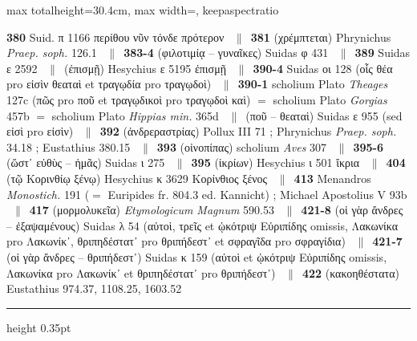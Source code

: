 \documentclass[11pt,twoside]{book}
\newcommand{\italique}[1]{\textit{#1}}
\newcommand{\Eustathe}{Eustathius }
\newcommand{\EtymMagnum}{\textit{Etymologicum Magnum} }
\newcommand{\Apostol}{Michael Apostolius }
\newcommand{\Phryn}{Phrynichus \textit{Praep. soph.} }
\newcommand{\espTest}{\ {\color{ruleGold}$\parallel$}\ }
\begin{document}
\begin{adjustbox}{max totalheight=30.4cm, max width=\textwidth, keepaspectratio}
\begin{minipage}{\textwidth}
{ \textbf{380} Suid. π 1166 περίθου νῦν τόνδε πρότερον \espTest \textbf{381} (χρέμπτεται) \Phryn 126.1 \espTest \textbf{383-4} (φιλοτιμίᾳ -- γυναῖκες) Suidas φ 431 \espTest \textbf{389} Suidas ε 2592 \espTest (ἐπισμῇ) Hesychius ε 5195 ἐπισμῇ \espTest \textbf{390-4} Suidas οι 128 (οἷς θέα pro εἰσὶν θεαταὶ et τραγῳδία pro τραγῳδοὶ) \espTest \textbf{390-1} scholium Plato \italique{Theages} 127c (πῶς pro ποῦ et τραγῳδικοὶ pro τραγῳδοὶ καὶ) $=$ scholium Plato \italique{Gorgias} 457b $=$ scholium Plato \italique{Hippias min.} 365d \espTest (ποῦ -- θεαταὶ) Suidas ε 955 (sed εἰσὶ pro εἰσὶν) \espTest \textbf{392} (ἀνδρεραστρίας) Pollux III 71 ; \Phryn 34.18 ; \Eustathe 380.15 \espTest \textbf{393} (οἰνοπίπας) scholium \italique{Aves} 307 \espTest \textbf{395-6} (ὥστ᾽ εὐθὺς -- ἡμᾶς) Suidas ι 275 \espTest \textbf{395} (ἰκρίων) Hesychius ι 501 ἴκρια \espTest \textbf{404} (τῷ Κορινθίῳ ξένῳ) Hesychius κ 3629 Κορίνθιος ξένος \espTest \textbf{413} Menandros \italique{Monostich.} 191 ($=$ Euripides fr. 804.3 ed. Kannicht) ; \Apostol V 93b \espTest \textbf{417} (μορμολυκεῖα) \EtymMagnum 590.53 \espTest \textbf{421-8} (οἱ γὰρ ἄνδρες -- ἐξαψαμένους) Suidas λ 54 (αὐτοὶ, τρεῖς et ᾡκότριψ Εὐριπίδης omissis, Λακωνίκα pro Λακωνίκ᾽, θριπηδέστατ᾽ pro θριπήδεστ᾽ et σφραγῖδα pro σφραγίδια) \espTest \textbf{421-7} (οἱ γὰρ ἄνδρες -- θριπήδεστ᾽) Suidas κ 159 (αὐτοὶ et ᾡκότριψ Εὐριπίδης omissis, Λακωνίκα pro Λακωνίκ᾽ et θριπηδέστατ᾽ pro θριπήδεστ᾽) \espTest \textbf{422} (κακοηθέστατα) \Eustathe 974.37, 1108.25, 1603.52\par\vspace{2.5pt}
{\color{ruleGold}\hrule height 0.35pt}\vspace{2.5pt}
}
\end{minipage}
\end{adjustbox}
\end{document}
